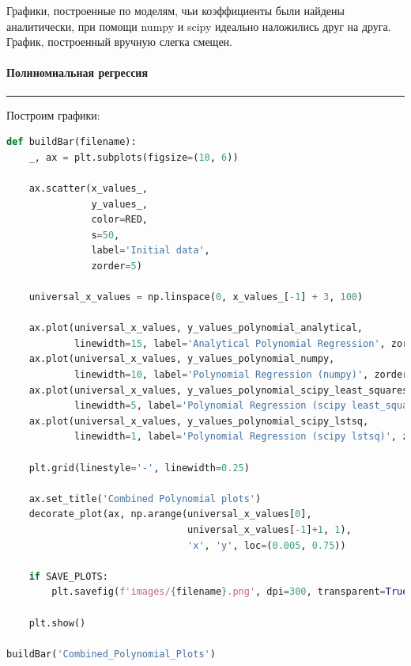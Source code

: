 \documentclass[a4paper, 14pt]{extarticle}
\begin{document}
Графики, построенные по моделям, чьи коэффициенты были найдены аналитически, при помощи numpy и scipy 
идеально наложились друг на друга. График, построенный вручную слегка смещен.

\paragraph*{{Полиномиальная регрессия}}\vspace{-20pt}\rule{\linewidth}{0.1mm}

Построим графики:

\begin{center}
    \begin{lstlisting}[language=Python]
def buildBar(filename):
    _, ax = plt.subplots(figsize=(10, 6))

    ax.scatter(x_values_, 
               y_values_, 
               color=RED,
               s=50,
               label='Initial data', 
               zorder=5)

    universal_x_values = np.linspace(0, x_values_[-1] + 3, 100)

    ax.plot(universal_x_values, y_values_polynomial_analytical, 
            linewidth=15, label='Analytical Polynomial Regression', zorder=1)
    ax.plot(universal_x_values, y_values_polynomial_numpy, 
            linewidth=10, label='Polynomial Regression (numpy)', zorder=2)
    ax.plot(universal_x_values, y_values_polynomial_scipy_least_squares, 
            linewidth=5, label='Polynomial Regression (scipy least_squares)', zorder=3)
    ax.plot(universal_x_values, y_values_polynomial_scipy_lstsq, 
            linewidth=1, label='Polynomial Regression (scipy lstsq)', zorder=4)

    plt.grid(linestyle='-', linewidth=0.25)

    ax.set_title('Combined Polynomial plots')
    decorate_plot(ax, np.arange(universal_x_values[0], 
                                universal_x_values[-1]+1, 1), 
                                'x', 'y', loc=(0.005, 0.75))
    
    if SAVE_PLOTS:
        plt.savefig(f'images/{filename}.png', dpi=300, transparent=True)

    plt.show()

buildBar('Combined_Polynomial_Plots')
    \end{lstlisting}
\end{center}
\end{document}
